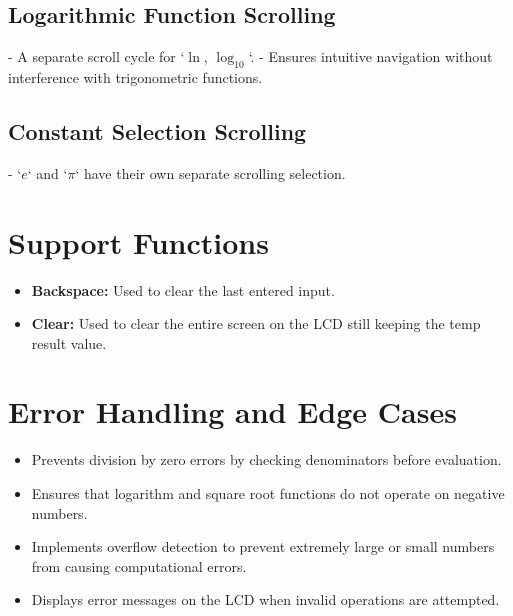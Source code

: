 \documentclass{article}
\begin{document}
\subsection{Logarithmic Function Scrolling}
- A separate scroll cycle for `$\ln$, $\log_{10}$`.
- Ensures intuitive navigation without interference with trigonometric functions.

\subsection{Constant Selection Scrolling}
- `$e$` and `$\pi$` have their own separate scrolling selection.

\section{Support Functions}
\begin{itemize}
	\item \textbf{Backspace:} Used to clear the last entered input.
	\item \textbf{Clear:} Used to clear the entire screen on the LCD still keeping the temp result value.
\end{itemize}

\section{Error Handling and Edge Cases}
\begin{itemize}
	\item Prevents division by zero errors by checking denominators before evaluation.
	\item Ensures that logarithm and square root functions do not operate on negative numbers.
	\item Implements overflow detection to prevent extremely large or small numbers from causing computational errors.
	\item Displays error messages on the LCD when invalid operations are attempted.
\end{itemize}
\end{document}
